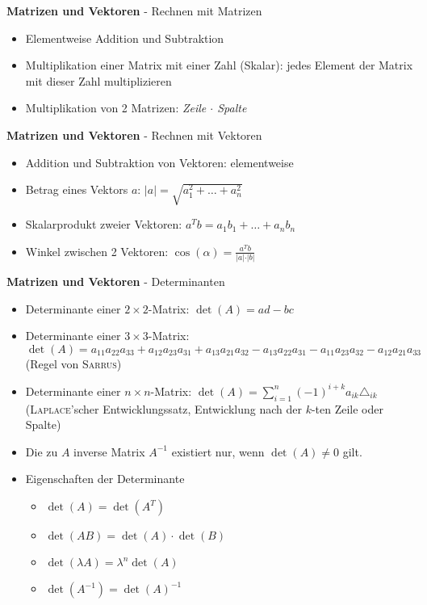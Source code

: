 \documentclass[10pt,landscape,a4paper]{article}
\begin{document}
\begin{multicols*}{4}
\begin{center}
	\normalsize{\textbf{Matrizen und Vektoren} - Rechnen mit Matrizen} \\
\end{center}
\begin{itemize}
	\item Elementweise Addition und Subtraktion
	\item Multiplikation einer Matrix mit einer Zahl (Skalar): jedes Element der Matrix mit dieser Zahl multiplizieren
	\item Multiplikation von 2 Matrizen: \textit{Zeile $\cdot$ Spalte}
\end{itemize}

\begin{center}
	\normalsize{\textbf{Matrizen und Vektoren} - Rechnen mit Vektoren} \\
\end{center}
\begin{itemize}
	\item Addition und Subtraktion von Vektoren: elementweise
	\item Betrag eines Vektors $a$: $\vert a\vert = \sqrt{a_1^2 + \dots + a_n^2}$
	\item Skalarprodukt zweier Vektoren: $a^Tb = a_1b_1 + \dots + a_nb_n$
	\item Winkel zwischen 2 Vektoren: $\cos(\alpha) = \frac{a^Tb}{\vert a\vert\cdot\vert b\vert}$
\end{itemize}

\begin{center}
	\normalsize{\textbf{Matrizen und Vektoren} - Determinanten} \\
\end{center}
\begin{itemize}
	\item Determinante einer $2\times 2$-Matrix: $\det(A)=ad-bc$
	\item Determinante einer $3\times 3$-Matrix: $\det(A)=a_{11}a_{22}a_{33} + a_{12}a_{23}a_{31} + a_{13}a_{21}a_{32} - a_{13}a_{22}a_{31} - a_{11}a_{23}a_{32} - a_{12}a_{21}a_{33}$ (Regel von \textsc{Sarrus})
	\item Determinante einer $n\times n$-Matrix: $\det(A) = \sum_{i=1}^{n} (-1)^{i+k} a_{ik}\triangle_{ik}$ (\textsc{Laplace}'scher Entwicklungssatz, Entwicklung nach der $k$-ten Zeile oder Spalte)
	\item Die zu $A$ inverse Matrix $A^{-1}$ existiert nur, wenn $\det(A)\neq 0$ gilt.
	\item Eigenschaften der Determinante
	\begin{itemize}
		\item $\det(A) = \det(A^T)$
		\item $\det(AB) = \det(A)\cdot\det(B)$
		\item $\det(\lambda A) = \lambda^n\det(A)$
		\item $\det(A^{-1}) = \det(A)^{-1}$
	\end{itemize}
\end{itemize}


\end{multicols*}
\end{document}
